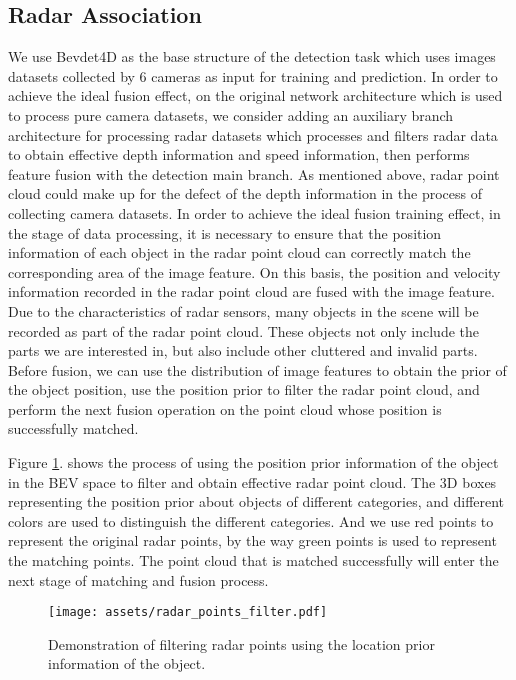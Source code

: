 \documentclass[10pt,twocolumn,letterpaper]{article}
\begin{document}
\subsection{Radar Association}
We use Bevdet4D as the base structure of the detection task which uses images datasets collected by 6 cameras as input for training and prediction. In order to achieve the ideal fusion effect, on the original network architecture which is used to process pure camera datasets, we consider adding an auxiliary branch architecture for processing radar datasets which processes and filters radar data to obtain effective depth information and speed information, then performs feature fusion with the detection main branch. As mentioned above, radar point cloud could make up for the defect of the depth information in the process of collecting camera datasets. In order to achieve the ideal fusion training effect, in the stage of data processing, it is necessary to ensure that the position information of each object in the radar point cloud can correctly match the corresponding area of the image feature. On this basis, the position and velocity information recorded in the radar point cloud are fused with the image feature. Due to the characteristics of radar sensors, many objects in the scene will be recorded as part of the radar point cloud. These objects not only include the parts we are interested in, but also include other cluttered and invalid parts. Before fusion, we can use the distribution of image features to obtain the prior of the object position, use the position prior to filter the radar point cloud, and perform the next fusion operation on the point cloud whose position is successfully matched.

    Figure \ref{fig:radar_filter}. shows the process of using the position prior information of the object in the BEV space to filter and obtain effective radar point cloud. The 3D boxes representing the position prior about objects of different categories, and different colors are used to distinguish the different categories. And we use red points to represent the original radar points, by the way green points is used to represent the matching points. The point cloud that is matched successfully will enter the next stage of matching and fusion process.
\begin{figure}[htp]
    \centering
    \texttt{[image: assets/radar\_points\_filter.pdf]}
    \caption{Demonstration of filtering radar points using the location prior information of the object.}
    \label{fig:radar_filter}
\end{figure}
\end{document}
